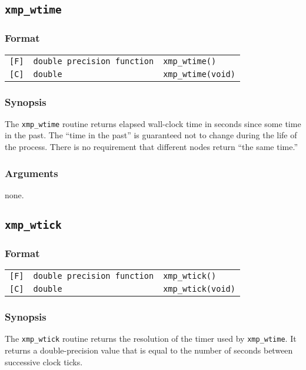 \subsection{\tt xmp\_wtime}

\subsubsection*{Format}

\begin{tabular}{lll}
\verb![F]!&  {\tt double precision function}& {\tt xmp\_wtime()}\\
\verb![C]!&  {\tt double}& {\tt xmp\_wtime(void)}
\end{tabular}

\subsubsection*{Synopsis}
The {\tt xmp\_wtime} routine returns elapsed wall-clock time in seconds 
since some time in the past. The ``time in the past'' is guaranteed
not to change during the life of the process.
There is no requirement that different nodes return ``the same time.''

\subsubsection*{Arguments}
none.

\subsection{\tt xmp\_wtick}

\subsubsection*{Format}

\begin{tabular}{lll}
\verb![F]!&  {\tt double precision function}& {\tt xmp\_wtick()}\\
\verb![C]!&  {\tt double}& {\tt xmp\_wtick(void)}
\end{tabular}

\subsubsection*{Synopsis}
The {\tt xmp\_wtick} routine returns the resolution of the timer
used by {\tt xmp\_wtime}. 
It returns a double-precision value that is equal to the number of seconds 
between successive clock ticks.

